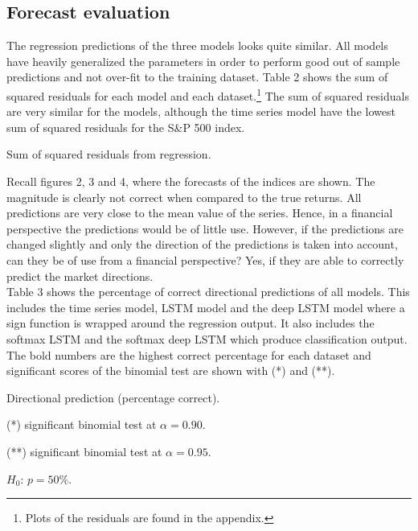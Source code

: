 \documentclass[12pt, letterpaper]{amsart}%
\begin{document}
\subsection{Forecast evaluation}
The regression predictions of the three models looks quite similar. All models have heavily generalized the parameters in order to perform good out of sample predictions and not over-fit to the training dataset. Table 2 shows the sum of squared residuals for each model and each dataset.\footnote{Plots of the residuals are found in the appendix.} The sum of squared residuals are very similar for the models, although the time series model have the lowest sum of squared residuals for the S\&P 500 index.

\begin{table}[H]
\centering
\caption{Sum of squared residuals from regression.}
\end{table}

Recall figures 2, 3 and 4, where the forecasts of the indices are shown. The magnitude is clearly not correct when compared to the true returns. All predictions are very close to the mean value of the series. Hence, in a financial perspective the predictions would be of little use. However, if the predictions are changed slightly and only the direction of the predictions is taken into account, can they be of use from a financial perspective? Yes, if they are able to correctly predict the market directions.
\\

Table 3 shows the percentage of correct directional predictions of all models. This includes the time series model, LSTM model and the deep LSTM model where a sign function is wrapped around the regression output. It also includes the softmax LSTM and the softmax deep LSTM which produce classification output. The bold numbers are the highest correct percentage for each dataset and significant scores of the binomial test are shown with (*) and (**).

\begin{table}[H]
\centering
\caption{Directional prediction (percentage correct).}
	\begin{tablenotes}
	\small
	\item  (*) significant binomial test at $\alpha=0.90$.
	\item (**) significant binomial test at $\alpha=0.95$.
	\item $H_0$: $p = 50\%$.
	\end{tablenotes}
\end{table}
\end{document}
